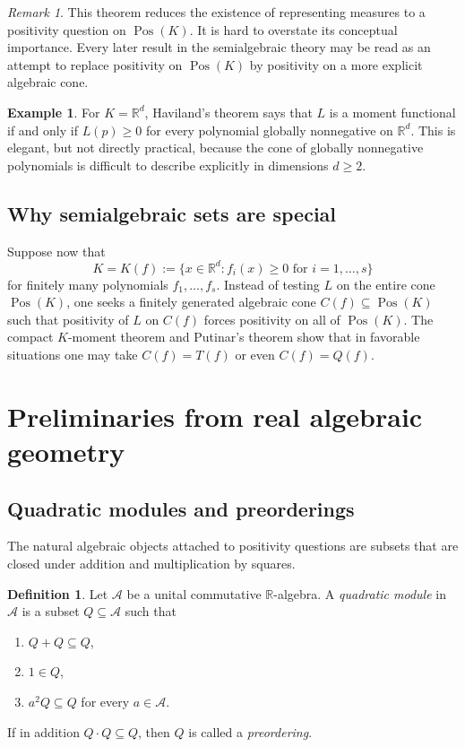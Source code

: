 \documentclass[11pt]{amsart}
\numberwithin{equation}{section}
\theoremstyle{definition}
\newtheorem{definition}[theorem]{Definition}
\newtheorem{example}[theorem]{Example}
\theoremstyle{remark}
\newtheorem{remark}[theorem]{Remark}
\newcommand{\R}{\mathbb{R}}
\newcommand{\Acal}{\mathcal{A}}
\newcommand{\Pos}{\operatorname{Pos}}
\newcommand{\1}{\mathbf{1}}
\begin{document}
\begin{remark}
This theorem reduces the existence of representing measures to a positivity question on \(\Pos(K)\). It is hard to overstate its conceptual importance. Every later result in the semialgebraic theory may be read as an attempt to replace positivity on \(\Pos(K)\) by positivity on a more explicit algebraic cone.
\end{remark}

\begin{example}
For \(K=\R^d\), Haviland's theorem says that \(L\) is a moment functional if and only if \(L(p)\ge 0\) for every polynomial globally nonnegative on \(\R^d\). This is elegant, but not directly practical, because the cone of globally nonnegative polynomials is difficult to describe explicitly in dimensions \(d\ge 2\).
\end{example}

\subsection{Why semialgebraic sets are special}

Suppose now that
\[
K=K(f):=\{x\in\R^d: f_i(x)\ge 0\text{ for }i=1,\dots,s\}
\]
for finitely many polynomials \(f_1,\dots,f_s\). Instead of testing \(L\) on the entire cone \(\Pos(K)\), one seeks a finitely generated algebraic cone \(C(f)\subseteq\Pos(K)\) such that positivity of \(L\) on \(C(f)\) forces positivity on all of \(\Pos(K)\). The compact \(K\)-moment theorem and Putinar's theorem show that in favorable situations one may take \(C(f)=T(f)\) or even \(C(f)=Q(f)\).

\section{Preliminaries from real algebraic geometry}\label{sec:rag}

\subsection{Quadratic modules and preorderings}

The natural algebraic objects attached to positivity questions are subsets that are closed under addition and multiplication by squares.

\begin{definition}
Let \(\Acal\) be a unital commutative \(\R\)-algebra. A \emph{quadratic module} in \(\Acal\) is a subset \(Q\subseteq\Acal\) such that
\begin{enumerate}[label=\textup{(\roman*)}, leftmargin=2em]
\item \(Q+Q\subseteq Q\),
\item \(1\in Q\),
\item \(a^2Q\subseteq Q\) for every \(a\in\Acal\).
\end{enumerate}
If in addition \(Q\cdot Q\subseteq Q\), then \(Q\) is called a \emph{preordering}.
\end{definition}
\end{document}

